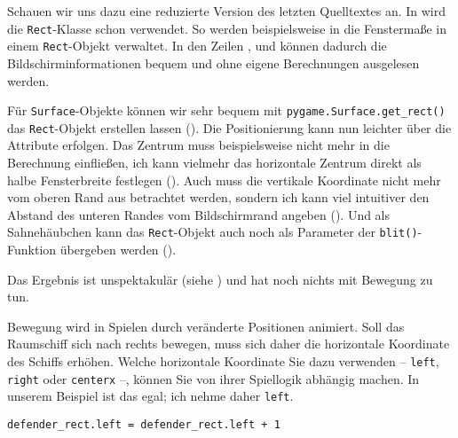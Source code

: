 Schauen wir uns dazu eine reduzierte Version des letzten Quelltextes an. In  wird die \texttt{Rect}-Klasse schon verwendet. So werden beispielsweise in  die Fenstermaße in einem \texttt{Rect}-Objekt verwaltet. In den Zeilen ,  und  können dadurch die Bildschirminformationen bequem und ohne eigene Berechnungen ausgelesen werden.


Für \texttt{Surface}-Objekte können wir sehr bequem mit \texttt{pygame.Surface.get\_rect()} das \texttt{Rect}-Objekt erstellen lassen (). Die Positionierung kann nun leichter über die Attribute erfolgen. Das Zentrum muss beispielsweise nicht mehr in die Berechnung einfließen, ich kann vielmehr das horizontale Zentrum direkt als halbe Fensterbreite festlegen (). Auch muss die vertikale Koordinate nicht mehr vom oberen Rand aus betrachtet werden, sondern ich kann viel intuitiver den Abstand des unteren Randes vom Bildschirmrand angeben (). Und als Sahnehäubchen kann das \texttt{Rect}-Objekt auch noch als Parameter der \texttt{blit()}-Funktion übergeben werden ().


Das Ergebnis ist unspektakulär (siehe ) und hat noch nichts mit Bewegung zu tun.

Bewegung wird in Spielen durch veränderte Positionen animiert. Soll das Raumschiff sich nach rechts bewegen, muss sich daher die horizontale Koordinate des Schiffs erhöhen. Welche horizontale Koordinate Sie dazu verwenden -- \texttt{left}, \texttt{right} oder \texttt{centerx} --, können Sie von ihrer Spiellogik abhängig machen. In unserem Beispiel ist das egal; ich nehme daher \texttt{left}.

\lstset{firstnumber=32}
\begin{lstlisting}
defender_rect.left = defender_rect.left + 1
\end{lstlisting}

